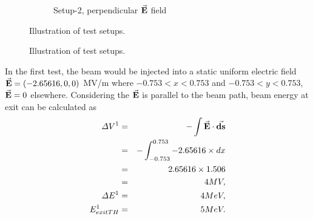 \documentclass[a4paper,oneside,12pt]{report}
\numberwithin{equation}{chapter}
\begin{document}
{\begin{figure}[H]
\begin{subfigure}{0.48\textwidth}
        \caption*{Setup-2, perpendicular $\vec{\textbf{E}}$ field}
    \end{subfigure}
    \caption{Illustration of test setups.}
\end{figure} \fi
\vspace{10pt}
\begin{figure}[H]
    \centering
    \qquad{}%
    \vspace{15pt}
    \caption{Illustration of test setups.}
\end{figure}
\clearpage
In the first test, the beam would be injected into a static uniform electric field \\
$\vec{\textbf{E}}=(-2.65616, 0, 0)$ MV/m where $-0.753<x<0.753$ and $-0.753<y<0.753$, $\vec{\textbf{E}}=0$ elsewhere.
Considering the $\vec{\textbf{E}}$ is parallel to the beam path, beam energy at exit can be calculated as
\vspace{-10pt}\begin{eqnarray}
    \Delta V^1 &=& - \int \dotProdBF{E}{ds} \nonumber\\
             &=& - \int_{-0.753}^{0.753} -2.65616 \times dx \nonumber\\
             &=& 2.65616 \times 1.506 \nonumber\\
             &=& 4 MV, \\
    \Delta E^1 &=& 4 MeV, \\
    E_{exitTH}^1 &=& 5 MeV.
\vspace{-10pt}\end{eqnarray}

}
\end{document}
